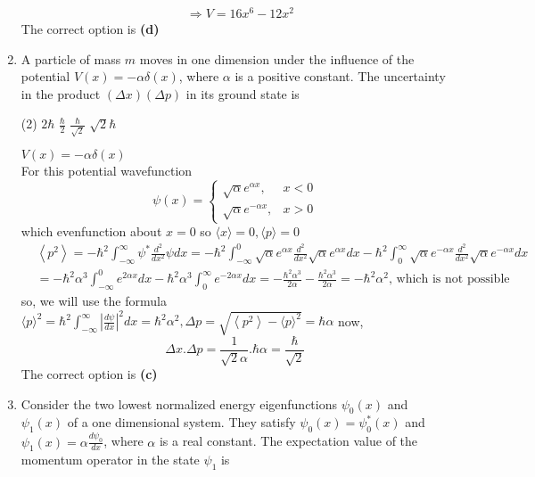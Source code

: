 \begin{enumerate}
\begin{answer}
\begin{align*}
		&\Rightarrow V=16 x^{6}-12 x^{2}
	\end{align*}
	The correct option is \textbf{(d)}
\end{answer}
	\item A particle of mass $m$ moves in one dimension under the influence of the potential $V(x)=-\alpha \delta(x)$, where $\alpha$ is a positive constant. The uncertainty in the product $(\Delta x)(\Delta p)$ in its ground state is
	{}
\begin{tasks}(2)
	\task[\textbf{A.}] $2 \hbar$
	\task[\textbf{B.}]$\frac{\hbar}{2}$
	\task[\textbf{C.}]$\frac{\hbar}{\sqrt{2}}$
	\task[\textbf{D.}]$\sqrt{2} \hbar$
\end{tasks}
\begin{answer}
	$V(x)=-\alpha \delta(x)$\\
	For this potential wavefunction
	$$
	\psi(x)= \begin{cases}\sqrt{\alpha} e^{\alpha x}, & x<0 \\ \sqrt{\alpha} e^{-\alpha x}, & x>0\end{cases}
	$$
	which evenfunction about $x=0$
	so $\langle x\rangle=0,\langle p\rangle=0$\\
	\begin{align*}
		&\left\langle p^{2}\right\rangle=-\hbar^{2} \int_{-\infty}^{\infty} \psi^{*} \frac{d^{2}}{d x^{2}} \psi d x=-\hbar^{2} \int_{-\infty}^{0} \sqrt{\alpha} e^{\alpha x} \frac{d^{2}}{d x^{2}} \sqrt{\alpha} e^{\alpha x} d x-\hbar^{2} \int_{0}^{\infty} \sqrt{\alpha} e^{-\alpha x} \frac{d^{2}}{d x^{2}} \sqrt{\alpha} e^{-\alpha x} d x \\
		&=-\hbar^{2} \alpha^{3} \int_{-\infty}^{0} e^{2 \alpha x} d x-\hbar^{2} \alpha^{3} \int_{0}^{\infty} e^{-2 \alpha x} d x=-\frac{\hbar^{2} \alpha^{3}}{2 \alpha}-\frac{\hbar^{2} \alpha^{3}}{2 \alpha}=-\hbar^{2} \alpha^{2} \text {, which is not possible }
	\end{align*}
	so, we will use the formula $\langle p\rangle^{2}=\hbar^{2} \int_{-\infty}^{\infty}\left|\frac{d \psi}{d x}\right|^{2} d x=\hbar^{2} \alpha^{2}, \Delta p=\sqrt{\left\langle p^{2}\right\rangle-\langle p\rangle^{2}}=\hbar \alpha$ now,
	$$
	\Delta x . \Delta p=\frac{1}{\sqrt{2} \alpha} . \hbar \alpha=\frac{\hbar}{\sqrt{2}}
	$$
	The correct option is \textbf{(c)}
\end{answer}
	\item Consider the two lowest normalized energy eigenfunctions $\psi_{0}(x)$ and $\psi_{1}(x)$ of a one dimensional system. They satisfy $\psi_{0}(x)=\psi_{0}^{*}(x)$ and $\psi_{1}(x)=\alpha \frac{d \psi_{0}}{d x}$, where $\alpha$ is a real constant. The expectation value of the momentum operator in the state $\psi_{1}$ is

\end{enumerate}
